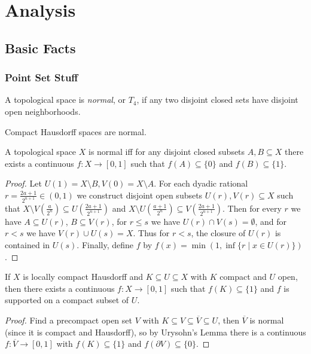 \documentclass[letterpaper,11pt]{report}
\begin{document}


\chapter{Analysis}

\section{Basic Facts}

\subsection{Point Set Stuff}

\begin{defn} A topological space is \emph{normal}, or $T_4$, if any two disjoint closed sets have disjoint open neighborhoods.
\end{defn}

\begin{prop} Compact Hausdorff spaces are normal.
\end{prop}

\begin{lem}\label{urysohn} A topological space $X$ is normal iff for any disjoint closed subsets $A,B \subseteq X$ there exists a continuous $f : X \rightarrow [0,1]$ such that $f(A) \subseteq \{0\}$ and $f(B) \subseteq \{1\}$.
\end{lem}
\begin{proof} Let $U(1) = X\setminus B, V(0) = X\setminus A$. For each dyadic rational $r = \frac{2a+1}{2^{n+1}} \in (0,1)$ we construct disjoint open subsets $U(r), V(r) \subseteq X$ such that $X \setminus V(\frac{a}{2^n}) \subseteq U(\frac{2a+1}{2^{n+1}})$ and $X\setminus U(\frac{a+1}{2^n}) \subseteq V(\frac{2a+1}{2^{n+1}})$. Then for every $r$ we have $A \subseteq U(r)$, $B \subseteq V(r)$, for $r \le s$ we have $U(r) \cap V(s) = \emptyset$, and for $r < s$ we have $V(r) \cup U(s) = X$. Thus for $r < s$, the closure of $U(r)$ is contained in $U(s)$. Finally, define $f$ by $f(x) = \min(1,\inf\{r \mid x \in U(r)\})$.
\end{proof}

\begin{lem}\label{lch-urysohn} If $X$ is locally compact Hausdorff and $K \subseteq U \subseteq X$ with $K$ compact and $U$ open, then there exists a continuous $f : X \rightarrow [0,1]$ such that $f(K) \subseteq \{1\}$ and $f$ is supported on a compact subset of $U$.
\end{lem}
\begin{proof} Find a precompact open set $V$ with $K \subseteq V \subseteq \overline{V} \subseteq U$, then $\overline{V}$ is normal (since it is compact and Hausdorff), so by Urysohn's Lemma there is a continuous $f : \overline{V} \rightarrow [0,1]$ with $f(K) \subseteq \{1\}$ and $f(\partial V) \subseteq \{0\}$.
\end{proof}
\end{document}
